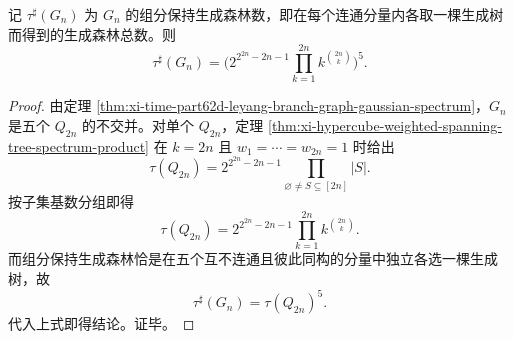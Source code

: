 \begin{theorem}\label{thm:xi-time-part62d-leyang-branch-kirchhoff-forest}
记 \(\tau^\sharp(G_n)\) 为 \(G_n\) 的组分保持生成森林数，即在每个连通分量内各取一棵生成树而得到的生成森林总数。则
\[
\tau^\sharp(G_n)
=
\Biggl(
2^{2^{2n}-2n-1}
\prod_{k=1}^{2n}k^{\binom{2n}{k}}
\Biggr)^5.
\]
\end{theorem}
\begin{proof}
由定理 \ref{thm:xi-time-part62d-leyang-branch-graph-gaussian-spectrum}，\(G_n\) 是五个 \(Q_{2n}\) 的不交并。对单个 \(Q_{2n}\)，定理 \ref{thm:xi-hypercube-weighted-spanning-tree-spectrum-product} 在 \(k=2n\) 且 \(w_1=\cdots=w_{2n}=1\) 时给出
\[
\tau(Q_{2n})
=
2^{2^{2n}-2n-1}
\prod_{\varnothing\neq S\subseteq[2n]}|S|.
\]
按子集基数分组即得
\[
\tau(Q_{2n})
=
2^{2^{2n}-2n-1}
\prod_{k=1}^{2n}k^{\binom{2n}{k}}.
\]
而组分保持生成森林恰是在五个互不连通且彼此同构的分量中独立各选一棵生成树，故
\[
\tau^\sharp(G_n)=\tau(Q_{2n})^5.
\]
代入上式即得结论。证毕。
\end{proof}

